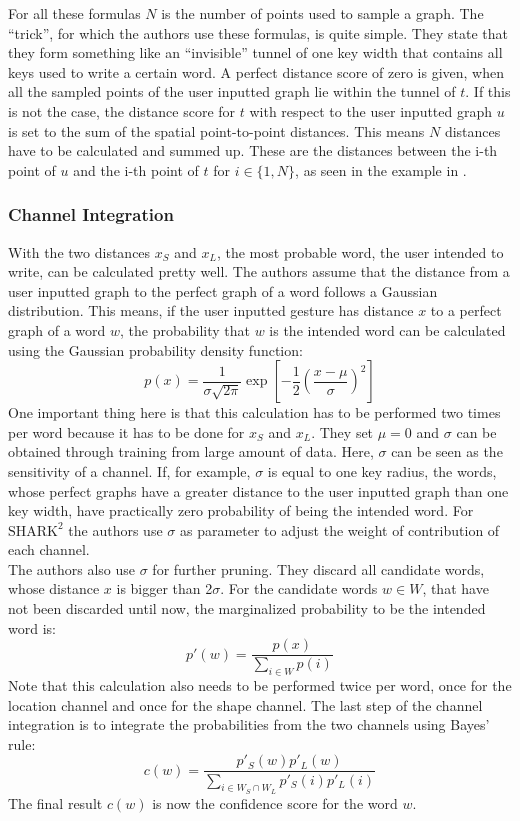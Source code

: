 For all these formulas $N$ is the number of points used to sample a graph. The ``trick'', for which the authors use these formulas, is quite simple. They state that they form something like an ``invisible'' tunnel of one key width that contains all keys used to write a certain word. A perfect distance score of zero is given, when all the sampled points of the user inputted graph lie within the tunnel of $t$. If this is not the case, the distance score for $t$ with respect to the user inputted graph $u$ is set to the sum of the spatial point-to-point distances. This means $N$ distances have to be calculated and summed up. These are the distances between the i-th point of $u$ and the i-th point of $t$ for $i \in \{1,N\}$, as seen in the example in .

\subsubsection{Channel Integration}
With the two distances $x_S$ and $x_L$, the most probable word, the user intended to write, can be calculated pretty well. The authors assume that the distance from a user inputted graph to the perfect graph of a word follows a Gaussian distribution. This means, if the user inputted gesture has distance $x$ to a perfect graph of a word $w$, the probability that $w$ is the intended word can be calculated using the Gaussian probability density function:
\begin{equation}
    p(x) = \frac{1}{\sigma\sqrt{2\pi}}\exp\left[{-\frac{1}{2}}\left(\frac{x-\mu}{\sigma}\right)^2\right]
    \label{eqn:gaussian}
\end{equation}
One important thing here is that this calculation has to be performed two times per word because it has to be done for $x_S$ and $x_L$. They set $\mu = 0$ and $\sigma$ can be obtained through training from large amount of data. Here, $\sigma$ can be seen as the sensitivity of a channel. If, for example, $\sigma$ is equal to one key radius, the words, whose perfect graphs have a greater distance to the user inputted graph than one key width, have practically zero probability of being the intended word. For $\text{SHARK}^2$ the authors use $\sigma$ as parameter to adjust the weight of contribution of each channel.\\
The authors also use $\sigma$ for further pruning. They discard all candidate words, whose distance $x$ is bigger than 2$\sigma$. For the candidate words $w \in W$, that have not been discarded until now, the marginalized probability to be the intended word is: 
\begin{equation}
    p'(w) = \frac{p(x)}{\sum\limits_{i \in W}p(i)}
\end{equation}
Note that this calculation also needs to be performed twice per word, once for the location channel and once for the shape channel. The last step of the channel integration is to integrate the probabilities from the two channels using Bayes' rule:
\begin{equation}
    c(w) = \frac{p'_S(w)p'_L(w)}{\sum\limits_{i \in W_S \cap W_L}p'_S(i)p'_L(i)}
\end{equation}
The final result $c(w)$ is now the confidence score for the word $w$.

